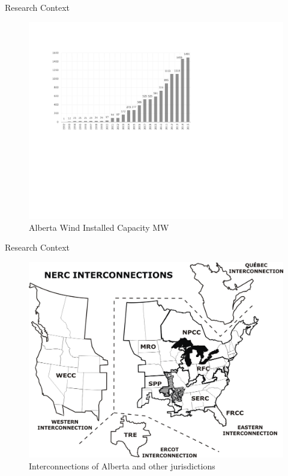 \documentclass[newPxFont,numfooter,progressbar,sectionpages]{beamer}
\begin{document}

\begin{frame}[c]{Research Context}


\begin{figure}
	\centering
	\includegraphics[width=0.9\linewidth]{"figure/abwindcapacitym"}
	\caption{Alberta Wind Installed Capacity MW}
	\label{fig:abensource}
\end{figure}



\end{frame}





\begin{frame}[c]{Research Context}


\begin{figure}
	\centering
	\includegraphics[width=0.8\linewidth]{"figure/Interconnection"}
	\caption{Interconnections of Alberta and other jurisdictions}
	\label{fig:Interconnection}
\end{figure}



\end{frame}
\end{document}
